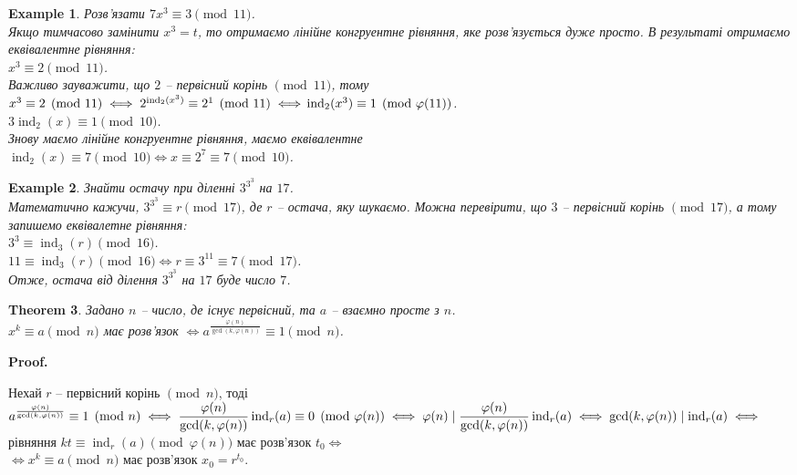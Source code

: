 \documentclass[a4paper, 10pt]{article}
\makeatletter
\theoremstyle{theoremdd}
\newtheorem{theorem}{Theorem}[subsection]
\theoremstyle{theoremdd}
\theoremstyle{theoremdd}
\theoremstyle{theoremdd}
\newtheorem{example}[theorem]{Example}
\theoremstyle{theoremdd}
\theoremstyle{theoremdd}
\theoremstyle{theoremdd}
\theoremstyle{theoremdd}
\renewenvironment{proof}[1][Proof.\\]{\par
\pushQED{\hfill \qed}%
\normalfont \topsep6\p@\@plus6\p@\relax
\trivlist
\item\relax
{\bfseries
#1\@addpunct{.}}\hspace\labelsep\ignorespaces
}{%
\popQED\endtrivlist\@endpefalse
}
\DeclareMathOperator{\ind}{ind}
\makeatother
\begin{document}
\begin{example}
Розв'язати $7x^3 \equiv 3 \pmod {11}$.\\
Якщо тимчасово замінити $x^3 = t$, то отримаємо лінійне конгруентне рівняння, яке розв'язується дуже просто. В результаті отримаємо еквівалентне рівняння:\\
$x^3 \equiv 2 \pmod {11}$.\\
Важливо зауважити, що $2$ -- первісний корінь $\!\! \pmod {11}$, тому\\
$x^3 \equiv 2 \pmod {11} \iff 2^{\ind_2 (x^3)} \equiv 2^1 \pmod {11} \iff \\
\ind_2 (x^3) \equiv 1 \pmod {\varphi(11)}$.\\
$3 \ind_2 (x) \equiv 1 \pmod {10}$.\\
Знову маємо лінійне конгруентне рівняння, маємо еквівалентне\\
$\ind_2 (x) \equiv 7 \pmod {10} \iff x \equiv 2^7 \equiv 7 \pmod {10}$.
\end{example}

\begin{example}
Знайти остачу при діленні $3^{3^3}$ на $17$.\\
Математично кажучи, $3^{3^3} \equiv r \pmod {17}$, де $r$ -- остача, яку шукаємо. Можна перевірити, що $3$ -- первісний корінь $\!\! \pmod {17}$, а тому запишемо еквівалетне рівняння:\\
$3^3 \equiv \ind_3 (r) \pmod {16}$.\\
$11 \equiv \ind_3 (r) \pmod {16} \iff r \equiv 3^{11} \equiv 7 \pmod {17}$.\\
Отже, остача від ділення $3^{3^3}$ на $17$ буде число $7$.
\end{example}

\begin{theorem}
Задано $n$ -- число, де існує первісний, та $a$ -- взаємно просте з $n$.\\
$x^k \equiv a \pmod n$ має розв'язок $\iff a^{\frac{\varphi(n)}{\gcd(k,\varphi(n))}} \equiv 1 \pmod n$.
\end{theorem}

\begin{proof}
Нехай $r$ -- первісний корінь $\!\! \pmod n$, тоді\\
$a^{\frac{\varphi(n)}{\gcd(k,\varphi(n))}} \equiv 1 \pmod n \iff \dfrac{\varphi(n)}{\gcd(k,\varphi(n))} \ind_r (a) \equiv 0 \pmod {\varphi(n)} \\
\iff \varphi(n) \mid \dfrac{\varphi(n)}{\gcd(k,\varphi(n))} \ind_r(a) \iff \gcd(k,\varphi(n)) \mid \ind_r(a) \iff$\\
рівняння $kt \equiv \ind_r (a) \pmod {\varphi(n)}$ має розв'язок $t_0 \iff$\\
$\iff x^k \equiv a \pmod n$ має розв'язок $x_0 = r^{t_0}$.
\end{proof}
\end{document}
